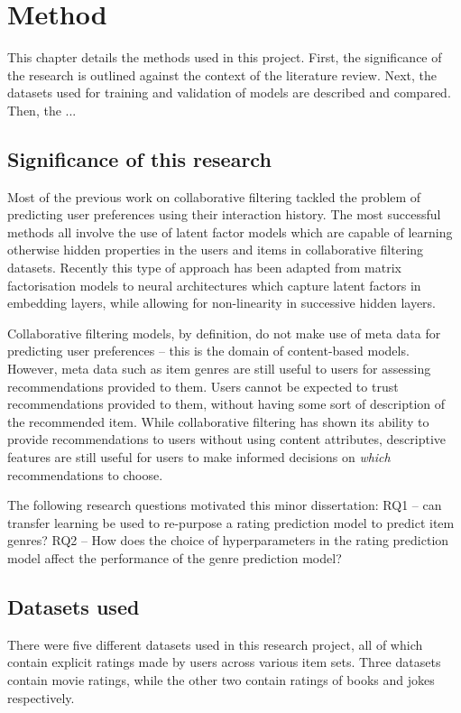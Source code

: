 \chapter{Method}
This chapter details the methods used in this project. First, the significance of the research is outlined against the context of the literature review. Next, the datasets used for training and validation of models are described and compared. Then, the ...

\section{Significance of this research}
Most of the previous work on collaborative filtering tackled the problem of predicting user preferences using their interaction history. The most successful methods all involve the use of latent factor models which are capable of learning otherwise hidden properties in the users and items in collaborative filtering datasets. Recently this type of approach has been adapted from matrix factorisation models to neural architectures which capture latent factors in embedding layers, while allowing for non-linearity in successive hidden layers. 

Collaborative filtering models, by definition, do not make use of meta data for predicting user preferences -- this is the domain of content-based models. However, meta data such as item genres are still useful to users for assessing recommendations provided to them. Users cannot be expected to trust recommendations provided to them, without having some sort of description of the recommended item. While collaborative filtering has shown its ability to provide recommendations to users without using content attributes, descriptive features are still useful for users to make informed decisions on \textit{which} recommendations to choose.

The following research questions motivated this minor dissertation: RQ1 -- can transfer learning be used to re-purpose a rating prediction model to predict item genres? RQ2 -- How does the choice of hyperparameters in the rating prediction model affect the performance of the genre prediction model?

\section{Datasets used}
There were five different datasets used in this research project, all of which contain explicit ratings made by users across various item sets. Three datasets contain movie ratings, while the other two contain ratings of books and jokes respectively.

